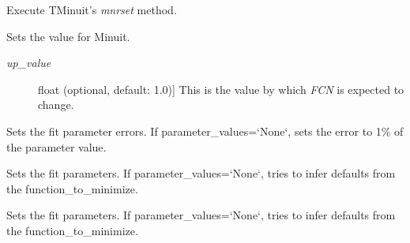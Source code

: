 \documentclass[a4paper,10pt,english]{sphinxmanual}
\begin{document}
\begin{fulllineitems}
\begin{fulllineitems}
\begin{description}
\end{description}

\end{fulllineitems}


\begin{fulllineitems}
\label{index:kafe.minuit.Minuit.reset}
Execute TMinuit's \emph{mnrset} method.

\end{fulllineitems}


\begin{fulllineitems}
\label{index:kafe.minuit.Minuit.set_err}
Sets the  value for Minuit.
\begin{description}
\item[{\emph{up\_value}}] \leavevmode{[}float (optional, default: 1.0){]}
This is the value by which \emph{FCN} is expected to change.

\end{description}

\end{fulllineitems}


\begin{fulllineitems}
\label{index:kafe.minuit.Minuit.set_parameter_errors}
Sets the fit parameter errors. If parameter\_values={}`None{}`, sets the
error to 1\% of the parameter value.

\end{fulllineitems}


\begin{fulllineitems}
\label{index:kafe.minuit.Minuit.set_parameter_names}
Sets the fit parameters. If parameter\_values={}`None{}`, tries to infer
defaults from the function\_to\_minimize.

\end{fulllineitems}


\begin{fulllineitems}
\label{index:kafe.minuit.Minuit.set_parameter_values}
Sets the fit parameters. If parameter\_values={}`None{}`, tries to infer
defaults from the function\_to\_minimize.


\end{fulllineitems}
\end{fulllineitems}
\end{document}
